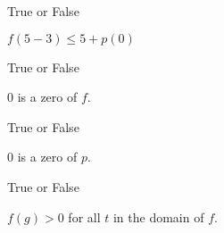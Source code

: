 \documentclass{ximera}
\begin{document}
\begin{exercise} True or False

$f(5 - 3) \leq 5 + p(0)$


\begin{multipleChoice}
\end{multipleChoice}

\end{exercise}











\begin{exercise} True or False

$0$ is a zero of $f$.


\begin{multipleChoice}
\end{multipleChoice}

\end{exercise}








\begin{exercise} True or False

$0$ is a zero of $p$.


\begin{multipleChoice}
\end{multipleChoice}

\end{exercise}










\begin{exercise} True or False

$f(g) > 0$ for all $t$ in the domain of $f$.


\begin{multipleChoice}
\end{multipleChoice}

\end{exercise}
\end{document}
